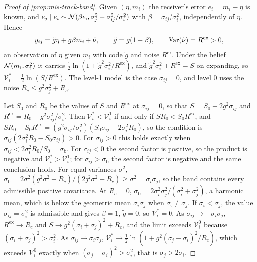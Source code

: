 \begin{proof}[Proof of \cref{prop:mis-track-band}]
Given $(\eta,m_i)$ the receiver's error $e_i=m_i-\eta$ is known, and $e_j\mid e_i\sim\mathcal{N}(\beta e_i,\sigma_j^2-\sigma_{ij}^2/\sigma_i^2)$ with $\beta=\sigma_{ij}/\sigma_i^2$, independently of $\eta$. Hence
\begin{equation*}
y_{ij}=\tilde g\eta+g\beta m_i+\tilde\nu,\qquad\tilde g=g(1-\beta),\qquad\operatorname{Var}(\tilde\nu)=R^{\mathrm{ex}}>0,
\end{equation*}
an observation of $\eta$ given $m_i$ with code $\tilde g$ and noise $R^{\mathrm{ex}}$. Under the belief $\mathcal{N}(m_i,\sigma_i^2)$ it carries $\tfrac12\ln(1+\tilde g^2\sigma_i^2/R^{\mathrm{ex}})$, and $\tilde g^2\sigma_i^2+R^{\mathrm{ex}}=S$ on expanding, so $\mathcal V^\ast_i=\tfrac12\ln(S/R^{\mathrm{ex}})$. The level-1 model is the case $\sigma_{ij}=0$, and level 0 uses the noise $R_c\le g^2\sigma_j^2+R_c$.

Let $S_0$ and $R_0$ be the values of $S$ and $R^{\mathrm{ex}}$ at $\sigma_{ij}=0$, so that $S=S_0-2g^2\sigma_{ij}$ and $R^{\mathrm{ex}}=R_0-g^2\sigma_{ij}^2/\sigma_i^2$. Then $\mathcal V^\ast_i<\mathcal V^1_i$ if and only if $SR_0<S_0R^{\mathrm{ex}}$, and $SR_0-S_0R^{\mathrm{ex}}=(g^2\sigma_{ij}/\sigma_i^2)(S_0\sigma_{ij}-2\sigma_i^2R_0)$, so the condition is $\sigma_{ij}(2\sigma_i^2R_0-S_0\sigma_{ij})>0$. For $\sigma_{ij}>0$ this holds exactly when $\sigma_{ij}<2\sigma_i^2R_0/S_0=\sigma_{\mathrm b}$. For $\sigma_{ij}<0$ the second factor is positive, so the product is negative and $\mathcal V^\ast_i>\mathcal V^1_i$; for $\sigma_{ij}>\sigma_{\mathrm b}$ the second factor is negative and the same conclusion holds. For equal variances $\sigma^2$, $\sigma_{\mathrm b}=2\sigma^2(g^2\sigma^2+R_c)/(2g^2\sigma^2+R_c)\ge\sigma^2=\sigma_i\sigma_j$, so the band contains every admissible positive covariance. At $R_c=0$, $\sigma_{\mathrm b}=2\sigma_i^2\sigma_j^2/(\sigma_i^2+\sigma_j^2)$, a harmonic mean, which is below the geometric mean $\sigma_i\sigma_j$ when $\sigma_i\neq\sigma_j$. If $\sigma_i<\sigma_j$, the value $\sigma_{ij}=\sigma_i^2$ is admissible and gives $\beta=1$, $\tilde g=0$, so $\mathcal V^\ast_i=0$. As $\sigma_{ij}\to-\sigma_i\sigma_j$, $R^{\mathrm{ex}}\to R_c$ and $S\to g^2(\sigma_i+\sigma_j)^2+R_c$, and the limit exceeds $\mathcal V^0_i$ because $(\sigma_i+\sigma_j)^2>\sigma_i^2$. As $\sigma_{ij}\to\sigma_i\sigma_j$, $\mathcal V^\ast_i\to\tfrac12\ln(1+g^2(\sigma_j-\sigma_i)^2/R_c)$, which exceeds $\mathcal V^0_i$ exactly when $(\sigma_j-\sigma_i)^2>\sigma_i^2$, that is $\sigma_j>2\sigma_i$.
\end{proof}

